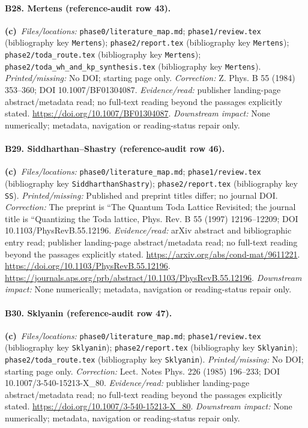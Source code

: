 \documentclass[11pt,a4paper]{article}
\newcommand{\C}{\textbf{(c)}\ }
\newcommand{\file}[1]{\nolinkurl{#1}}
\begin{document}
\paragraph{B28. Mertens (reference-audit row 43).}
\C \textit{Files/locations:} \file{phase0/literature_map.md}; \file{phase1/review.tex} (bibliography key \file{Mertens}); \file{phase2/report.tex} (bibliography key \file{Mertens}); \file{phase2/toda_route.tex} (bibliography key \file{Mertens}); \file{phase2/toda_wh_and_kp_synthesis.tex} (bibliography key \file{Mertens}).
\textit{Printed/missing:} No DOI; starting page only.
\textit{Correction:} Z. Phys. B 55 (1984) 353--360; DOI 10.1007/BF01304087.
\textit{Evidence/read:} publisher landing-page abstract/metadata read; no full-text reading beyond the passages explicitly stated.
\url{https://doi.org/10.1007/BF01304087}.
\textit{Downstream impact:} None numerically; metadata, navigation or reading-status repair only.
\paragraph{B29. Siddharthan--Shastry (reference-audit row 46).}
\C \textit{Files/locations:} \file{phase0/literature_map.md}; \file{phase1/review.tex} (bibliography key \file{SiddharthanShastry}); \file{phase2/report.tex} (bibliography key \file{SS}).
\textit{Printed/missing:} Published and preprint titles differ; no journal DOI.
\textit{Correction:} The preprint is ``The Quantum Toda Lattice Revisited; the journal title is ``Quantizing the Toda lattice, Phys. Rev. B 55 (1997) 12196--12209; DOI 10.1103/PhysRevB.55.12196.
\textit{Evidence/read:} arXiv abstract and bibliographic entry read; publisher landing-page abstract/metadata read; no full-text reading beyond the passages explicitly stated.
\url{https://arxiv.org/abs/cond-mat/9611221}.
\url{https://doi.org/10.1103/PhysRevB.55.12196}.
\url{https://journals.aps.org/prb/abstract/10.1103/PhysRevB.55.12196}.
\textit{Downstream impact:} None numerically; metadata, navigation or reading-status repair only.
\paragraph{B30. Sklyanin (reference-audit row 47).}
\C \textit{Files/locations:} \file{phase0/literature_map.md}; \file{phase1/review.tex} (bibliography key \file{Sklyanin}); \file{phase2/report.tex} (bibliography key \file{Sklyanin}); \file{phase2/toda_route.tex} (bibliography key \file{Sklyanin}).
\textit{Printed/missing:} No DOI; starting page only.
\textit{Correction:} Lect. Notes Phys. 226 (1985) 196--233; DOI 10.1007/3-540-15213-X\_80.
\textit{Evidence/read:} publisher landing-page abstract/metadata read; no full-text reading beyond the passages explicitly stated.
\url{https://doi.org/10.1007/3-540-15213-X_80}.
\textit{Downstream impact:} None numerically; metadata, navigation or reading-status repair only.
\end{document}
